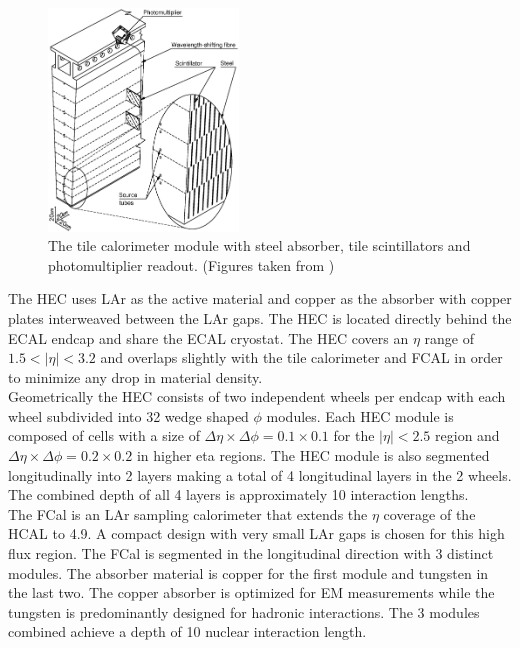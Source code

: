 \begin{figure}[h!]
\centering
\includegraphics[width=0.45\textwidth, angle=0]{figures/LHC_ATLAS/TileCal_Module3.eps}
\caption[The tile calorimeter module with steel absorber, tile scintillators and photomultiplier readout]{ The tile calorimeter module with steel absorber, tile scintillators and photomultiplier readout.  (Figures taken from \cite{ATLAS_JINST}) \label{LHC:fig:TileCalo}}
\end{figure}


\indent The HEC uses LAr as the active material and copper as the absorber with copper plates interweaved between the LAr gaps.  The HEC is located directly behind the ECAL endcap and share the ECAL cryostat.  The HEC  covers an $\eta$ range of $1.5<|\eta| < 3.2$ and overlaps slightly with the tile calorimeter and FCAL in order to minimize any drop in material density.  \\

\indent Geometrically the HEC consists of two independent wheels per endcap with each wheel subdivided into 32 wedge shaped $\phi$ modules.  Each HEC module is composed of cells with a size of $\Delta\eta \times \Delta\phi = 0.1 \times 0.1$ for the $|\eta|<2.5$ region and $\Delta\eta \times \Delta\phi = 0.2 \times 0.2$ in higher eta regions.  The HEC module is also segmented longitudinally into 2 layers making a total of 4 longitudinal layers in the 2 wheels. The combined depth of all 4 layers is approximately 10 interaction lengths. \\

\indent The FCal is an LAr sampling calorimeter that extends the $\eta$ coverage of the HCAL to 4.9.  A compact design with very small LAr gaps is chosen for this high flux region.  The FCal is segmented in the longitudinal direction with 3 distinct modules. The absorber material is copper for the first module and tungsten in the last two.  The copper absorber is optimized for EM measurements while the tungsten is predominantly designed for hadronic interactions.  The 3 modules combined achieve a depth of 10 nuclear interaction length. \\

